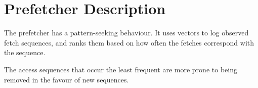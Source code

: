 \section*{Prefetcher Description}

The prefetcher has a pattern-seeking behaviour. It uses vectors to log observed fetch sequences, and ranks them based on how often the fetches correspond with the sequence. 


The access sequences that occur the least frequent are more prone to being removed in the favour of new sequences.

